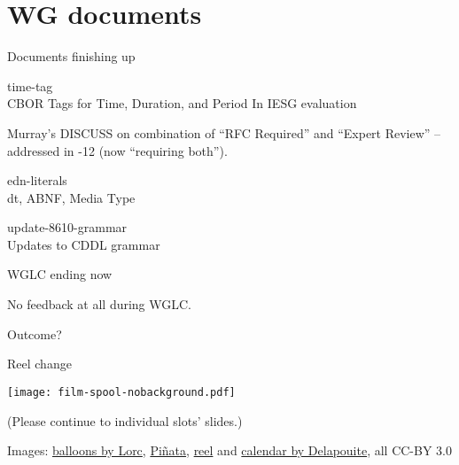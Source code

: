 \documentclass[aspectratio=169]{beamer}
\begin{document}
\section*{WG documents}

\begin{frame}{Documents finishing up}\large

    \begin{block}{\Large time-tag \\ \small CBOR Tags for Time, Duration, and Period}
        In IESG evaluation

        \medskip

        Murray's DISCUSS on combination of ``RFC Required'' and ``Expert Review''
        -- addressed in -12 (now ``requiring both'').
    \end{block}

    \bigskip

    \begin{block}{edn-literals \\ \scriptsize dt\textquotedbl\textquotedbl, ABNF, Media Type

        \normalsize \mbox{update-8610-grammar} \\ \scriptsize Updates to CDDL grammar
        }
        WGLC ending now

        \medskip

        No feedback at all during WGLC.

        \medskip

        Outcome?
    \end{block}

\end{frame}

\begin{frame}{Reel change}
    \begin{block}{\texttt{[image: film-spool-nobackground.pdf]}\mbox{\quad}}
        \mbox{}

        \vspace{-1.7cm}

        (Please continue to individual slots' slides.)
    \end{block}

    \vfill
    \tiny Images:
    \href{https://game-icons.net/1x1/lorc/balloons.html}{balloons by Lorc},
    \href{https://game-icons.net/1x1/delapouite/pinata.html}{Piñata},
    \href{https://game-icons.net/1x1/delapouite/film-spool.html}{reel} and
    \href{https://game-icons.net/1x1/delapouite/calendar.html}{calendar by Delapouite}, all CC-BY 3.0
\end{frame}
\end{document}
